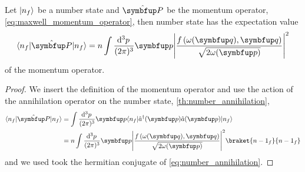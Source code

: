 \begin{lemma}
	Let $\lvert n_f\rangle$ be a number state and $\vu{P}$ be the momentum operator, \cref{eq:maxwell_momentum_operator}, then number state has the expectation value
	\begin{equation}
		\bra{n_f}
		\vu{P}
		\ket{n_f}
		=
		n
		\int\frac{\dd[3]{p}}{(2\pi)^3}
		\vb{p}
		\abs*{\frac{f\left(\omega(\vb{q}),\vb{q}\right)}{\sqrt{2\omega(\vb{p})}}}^2
	\end{equation}
	of the momentum operator.
\end{lemma}
\begin{proof}
	We insert the definition of the momentum operator and use the action of the annihilation operator on the number state, \cref{th:number_annihilation},
	\begin{equation}
		\begin{split}
			\bra{n_f}
			\vu{P}
			\ket{n_f}
			&=
			\int\frac{\dd[3]{p}}{(2\pi)^3}
			\vb{p}
			\bra{n_f}
			\hat{a}^\dagger(\vb{p})
			\hat{a}(\vb{p})
			\ket{n_f}
			\\
			&=
			n
			\int\frac{\dd[3]{p}}{(2\pi)^3}
			\vb{p}
			\abs*{\frac{f\left(\omega(\vb{q}),\vb{q}\right)}{\sqrt{2\omega(\vb{p})}}}^2
			\braket{{n-1}_f}{{n-1}_f}
		\end{split}
	\end{equation}
	and we used took the hermitian conjugate of \cref{eq:number_annihilation}.
\end{proof}

